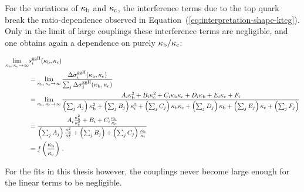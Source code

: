 For the variations of $\kappa_{\mathrm{b}}$ and $\kappa_{\mathrm{c}}$, the interference terms due to the top quark break the ratio-dependence observed in Equation~(\ref{eq:interpretation-shape-ktcg}).
% 
Only in the limit of large couplings these interference terms are negligible, and one obtains again a dependence on purely $\kappa_{\mathrm{b}}/\kappa_{\mathrm{c}}$:
% 
\begin{linenomath*}
\begin{equation}
\label{eq:interpretation-shape-kbkc}
\begin{split}
\lim_{\kappa_{\mathrm{b}},\,\kappa_{\mathrm{c}}\to\infty} & s^{\mathrm{g}\mathrm{g}\mathrm{H}}_i(\kappa_{\mathrm{b}}, \kappa_{\mathrm{c}}) \\
        &=
        \lim_{\kappa_{\mathrm{b}},\,\kappa_{\mathrm{c}}\to\infty}
        \frac
            {\Delta\sigma^{\mathrm{g}\mathrm{g}\mathrm{H}}_i(\kappa_{\mathrm{b}}, \kappa_{\mathrm{c}})}
            {\sum_j \Delta\sigma^{\mathrm{g}\mathrm{g}\mathrm{H}}_j(\kappa_{\mathrm{b}}, \kappa_{\mathrm{c}})}
            \\
        &=
        \lim_{\kappa_{\mathrm{b}},\,\kappa_{\mathrm{c}}\to\infty}
        \frac
            {A_i \kappa_{\mathrm{b}}^2 + B_i \kappa_{\mathrm{c}}^2 + C_i \kappa_{\mathrm{b}} \kappa_{\mathrm{c}}
                + D_i \kappa_{\mathrm{b}} + E_i \kappa_{\mathrm{c}} + F_i
                }
            {
                \left(\sum_j A_j\right) \kappa_{\mathrm{b}}^2
                + \left(\sum_j B_j\right) \kappa_{\mathrm{c}}^2
                + \left(\sum_j C_j\right) \kappa_{\mathrm{b}}\kappa_{\mathrm{c}}
                + \left(\sum_j D_j\right) \kappa_{\mathrm{b}}
                + \left(\sum_j E_j\right) \kappa_{\mathrm{c}}
                + \left(\sum_j F_j\right)
                }
            \\
        &=
        \frac
            {A_i \frac{\kappa_{\mathrm{b}}^2}{\kappa_{\mathrm{c}}^2} + B_i + C_i \frac{\kappa_{\mathrm{b}}}{\kappa_{\mathrm{c}}}}
            {
                \left(\sum_j A_j\right) \frac{\kappa_{\mathrm{b}}^2}{\kappa_{\mathrm{c}}^2}
                + \left(\sum_j B_j\right) 
                + \left(\sum_j C_j\right) \frac{\kappa_{\mathrm{b}}}{\kappa_{\mathrm{c}}}
                }
            \\
        & = f \left( \frac{\kappa_{\mathrm{b}}}{\kappa_{\mathrm{c}}} \right)
\,.
\end{split}
\end{equation}
\end{linenomath*}
% 
For the fits in this thesis however, the couplings never become large enough for the linear terms to be negligible.








